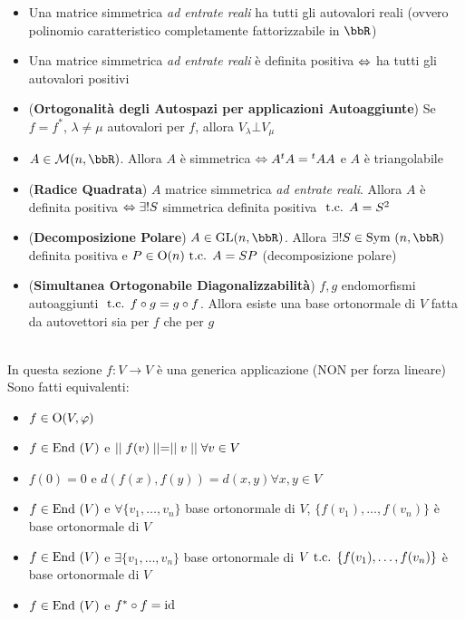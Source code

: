 \documentclass[a4paper,NoNotes,GeneralMath]{stdmdoc}
\begin{document}
\begin{itemize}
		\item Una matrice simmetrica {\it ad entrate reali} ha tutti gli autovalori reali (ovvero polinomio caratteristico completamente fattorizzabile in $\bbR$)
		\item Una matrice simmetrica {\it ad entrate reali} è definita positiva $\Leftrightarrow$ ha tutti gli autovalori positivi
		\item ({\bf Ortogonalità degli Autospazi per applicazioni Autoaggiunte}) Se $f = f^{*}$, $\lambda \neq \mu$ autovalori per $f$, allora $V_\lambda \bot V_\mu$
		\item $A \in \mathcal{M}(n, \bbR)$. Allora $A$ è simmetrica $\Leftrightarrow A {}^tA = {}^tAA$ e $A$ è triangolabile
		\item ({\bf Radice Quadrata}) $A$ matrice simmetrica {\it ad entrate reali}. Allora $A$ è definita positiva $\Leftrightarrow \exists ! S$ simmetrica definita positiva $\mbox{ t.c. } A = S^2$
		\item ({\bf Decomposizione Polare}) $A \in \GL(n, \bbR)$. Allora $\exists ! S \in \Symm(n, \bbR)$ definita positiva e $P \in \mbox{O}(n) \mbox{ t.c. } A = SP$ (decomposizione polare)
		\item ({\bf Simultanea Ortogonabile Diagonalizzabilità}) $f, g$ endomorfismi autoaggiunti $\mbox{ t.c. } f \circ g = g \circ f$. Allora esiste una base ortonormale di $V$ fatta da autovettori sia per $f$ che per $g$
	\end{itemize}

	 \\
	In questa sezione $f: V \rightarrow V$ è una generica applicazione (NON per forza lineare) \\
	Sono fatti equivalenti:
	\begin{itemize}
		\item $f \in \mbox{O}(V, \varphi)$
		\item $f \in \mbox{End }(V)$ e $\mid\mid f(v) \mid\mid = \mid\mid v \mid\mid \forall v \in V$
		\item $f(0)=0$ e $d(f(x), f(y)) = d(x, y) \forall x, y \in V$
		\item $f \in \mbox{End }(V)$ e $\forall \{v_1, \ldots, v_n\}$ base ortonormale di $V$, $\{f(v_1), \ldots, f(v_n)\}$ è base ortonormale di $V$
		\item $f \in \mbox{End }(V)$ e $\exists \{v_1, \ldots, v_n\}$ base ortonormale di $V \mbox{ t.c. } \{f(v_1), \ldots, f(v_n)\}$ è base ortonormale di $V$
		\item $f \in \mbox{End }(V)$ e $f^{*} \circ f = \mbox{id}$
	\end{itemize}
\end{document}
